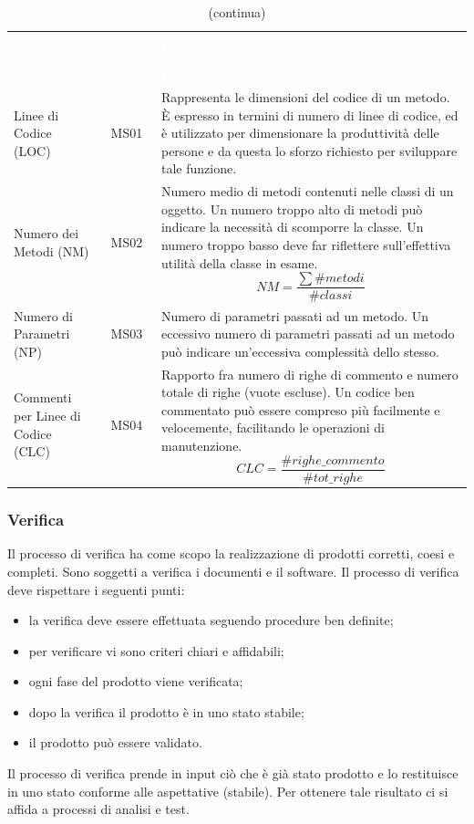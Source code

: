 \begin{longtable}{ C{4.5cm} c L{9.5cm} }
	\caption{Metriche del software}\\
		\textcolor{white}{\textbf{Nome}} & \textcolor{white}{\textbf{Codice}} & \centerline{\textcolor{white}{\textbf{Descrizione}}} \\
		\endfirsthead
		\caption[]{(continua)} \\
		\textcolor{white}{\textbf{Nome}} & \textcolor{white}{\textbf{Codice}} & \centerline{\textcolor{white}{\textbf{Descrizione}}} \\
		\endhead
		\label{par:MS01}Linee di Codice (LOC) & MS01 & Rappresenta  le  dimensioni  del  codice di un metodo. È espresso in termini di numero di linee di codice, ed è utilizzato per dimensionare la produttività delle persone e da questa lo sforzo richiesto per sviluppare tale funzione. \\
		Numero dei Metodi (NM)  & MS02 & Numero medio di metodi contenuti nelle classi di un oggetto. Un numero troppo alto di metodi può indicare la necessità di scomporre la classe. Un numero troppo basso deve far riflettere sull'effettiva utilità della classe in esame. 
		\[ NM =\frac{\sum\#metodi}{\#classi}  \] \\
		Numero di Parametri (NP) & MS03 & Numero di parametri passati ad un metodo. Un eccessivo numero di parametri passati ad un metodo può
indicare un'eccessiva complessità dello stesso. \\
		Commenti per Linee di \newline Codice (CLC) & MS04 & Rapporto fra numero di righe di commento e numero totale di righe (vuote escluse). Un codice ben commentato può essere compreso più facilmente e velocemente, facilitando le operazioni di manutenzione. 
		\[ CLC = \frac{\#righe\_commento}{\#tot\_righe}\] \\
	\end{longtable}
\pagebreak
\subsubsection{Verifica}
Il processo di verifica ha come scopo la realizzazione di prodotti corretti, coesi e completi. Sono soggetti a verifica i documenti e il software.
Il processo di verifica deve rispettare i seguenti punti: \begin{itemize}
\item la verifica deve essere effettuata seguendo procedure ben definite;
\item per verificare vi sono criteri chiari e affidabili;
\item ogni fase del prodotto viene verificata;
\item dopo la verifica il prodotto è in uno stato stabile;
\item il prodotto può essere validato.
\end{itemize}
Il processo di verifica prende in input ciò che è già stato prodotto e lo restituisce in uno stato
conforme alle aspettative (stabile). Per ottenere tale risultato ci si affida a processi di analisi e test.
